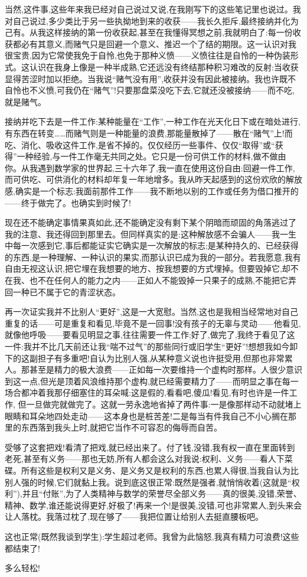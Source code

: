 当然,这件事,这些年来我已经对自己说过又说,在我刚写下的这些笔记里也说过。我对自己说过,多少类比于另一些执拗地到来的收获——我长久拒斥,最终接纳并化为己有。从我这样接纳的第一份收获起,甚至在我懂得冥想之前,我就明白了:每一份收获都必有其意义,而赌气只是回避一个意义、推迟一个了结的期限。这一认识对我很宝贵,因为它常使我免于自怜,也免于那种义愤——义愤往往是自怜的一种伪装形式。这认识在我身上像是一种半成熟,它还远没有终结那种积习难改的反射:当收获显得苦涩时加以拒绝。当我说“赌气没有用”,收获并没有因此被接纳。我也许既不自怜也不义愤,可我仍在“赌气”!只要那盘菜没吃下去,它就还没被接纳——而不吃,就是赌气。

接纳并吃下去是一件工作:某种能量在“工作”,一种工作在光天化日下或在暗处进行,有东西在转变……而赌气则是一种能量的浪费,那能量散掉了——散在“赌气”上!而吃、消化、吸收这件工作,是省不掉的。仅仅经历一些事件、仅仅“取得”或“获得”一种经验,与一件工作毫无共同之处。它只是一份可供工作的材料,做不做由你。从我遇到数学家的世界起,三十六年了,我一直在使用这份自由:回避一件工作,而可供吃、可供消化的材料却年复一年地增多。我从昨天起感到的这份欢欣的解放感,确实是一个标志:我面前那件工作——我不断地以别的工作或任务为借口推开的——终于做完了。也确实到时候了!

现在还不能确定事情果真如此,还不能确定没有剩下某个阴暗而顽固的角落逃过了我的注意、我还得回到那里去。但同样真实的是:这种解放感不会骗人——我一生中每一次感到它,事后都能证实它确实是一次解放的标志;是某种持久的、已经获得的东西,是一种理解、一种认识的果实,而那认识已成为我的一部分。若我愿意,我有自由无视这认识,把它埋在我想要的地方、按我想要的方式埋掉。但要毁掉它,却不在我、也不在任何人的能力之内——正如人不能毁掉一只果子的成熟,不能把它弄回一种已不属于它的青涩状态。

再一次证实我并不比别人“更好”,这是一大宽慰。当然,这也是我相当经常地对自己重复的话——可是重复和看见,毕竟不是一回事!没有孩子的无辜与灵动——他看见,就像他呼吸——要看见明显之事,往往需要一件工作;好了,做完了,我终于看见了这一件:我并不比几天前还让我“喘不过气”的那些同行或旧学生“更好”!想想我如今卸下的这副担子有多重吧!自认为比别人强,从某种意义说也许挺受用,但那也非常累人。那甚至是精力的极大浪费——正如每一次要维持一个虚构时那样。人很少意识到这一点,但光是顶着风浪维持那个虚构,就已经需要精力了——而明显之事在每一场合都冲着我那仔细塞住的耳朵喊:这是假的,看看吧,傻瓜!看见,有时也许是一件工作,
但一旦做完就做完了。这就一劳永逸地省掉了两件事:一是像那样动不动就堵上眼睛和耳朵地四处走动——这本身也是桩苦差!二是每当有件我自己不小心搁在那里的东西落到我头上时,就把它当作不可容忍的侮辱而自苦。

受够了这套把戏!看清了把戏,就已经出来了。付了钱,没错,我有权一直在里面转到老死,甚至有义务——那也无妨,所有人都会这么对我说:权利、义务——看人下菜碟。所有这些是权利又是义务、是义务又是权利的东西,也累人得很,当我自认为比别人强的时候,它们就黏上我。说到底这很正常:既然是强者,就悄悄收着(这就是“权利”),并且“付账”,为了人类精神与数学的荣誉尽全部义务——真的很美,没错,荣誉、精神、数学,谁还能说得更好,好极了!再来一个!是很美,没错,可也非常累人,到头来会让人落枕。我落过枕了,现在够了——我把位置让给别人去挺直腰板吧。

这也正常(既然我谈到学生):学生超过老师。我曾为此恼怒,我真有精力可浪费!这些都结束了!

多么轻松!

